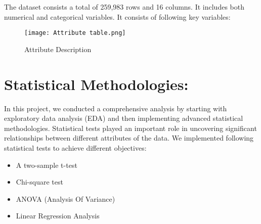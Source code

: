 \documentclass[sigconf]{acmart}
\begin{document}
The dataset consists a total of 259,983 rows and 16 columns. It includes both numerical and categorical variables. It consists of following key variables:

\begin{figure}[h] 
    \centering
    \texttt{[image: Attribute table.png]}
    \caption{Attribute Description}
    \label{fig:data_collection}
\end{figure}

\section{Statistical Methodologies: }

In this project, we conducted a comprehensive analysis by starting with exploratory data analysis (EDA) and then implementing advanced statistical methodologies. Statistical tests played an important role in uncovering significant relationships between different attributes of the data. We implemented following statistical tests to achieve different objectives:

\begin{itemize}
    \item A two-sample t-test
    \item Chi-square test
    \item ANOVA (Analysis Of Variance)
    \item Linear Regression Analysis
\end{itemize}
\end{document}

